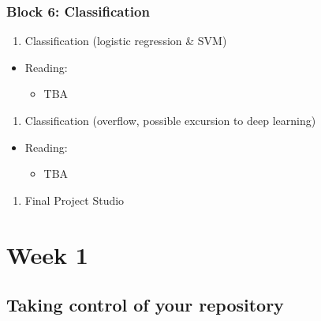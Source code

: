 \documentclass[]{book}
\providecommand{\tightlist}{%
  \setlength{\itemsep}{0pt}\setlength{\parskip}{0pt}}
\begin{document}
\hypertarget{block-6-classification}{%
\subsection{Block 6: Classification}\label{block-6-classification}}

\begin{enumerate}
\def\labelenumi{\arabic{enumi}.}
\setcounter{enumi}{11}
\tightlist
\item
  Classification (logistic regression \& SVM)
\end{enumerate}

\begin{itemize}
\tightlist
\item
  Reading:

  \begin{itemize}
  \tightlist
  \item
    TBA
  \end{itemize}
\end{itemize}

\begin{enumerate}
\def\labelenumi{\arabic{enumi}.}
\setcounter{enumi}{12}
\tightlist
\item
  Classification (overflow, possible excursion to deep learning)
\end{enumerate}

\begin{itemize}
\tightlist
\item
  Reading:

  \begin{itemize}
  \tightlist
  \item
    TBA
  \end{itemize}
\end{itemize}

\begin{enumerate}
\def\labelenumi{\arabic{enumi}.}
\setcounter{enumi}{13}
\tightlist
\item
  Final Project Studio
\end{enumerate}

\hypertarget{week-1}{%
\chapter{Week 1}\label{week-1}}

\hypertarget{taking-control-of-your-repository}{%
\section{Taking control of your repository}\label{taking-control-of-your-repository}}
\end{document}
